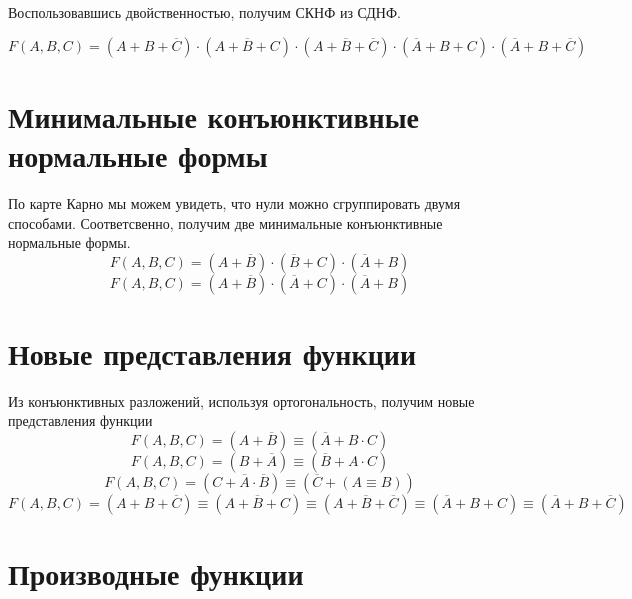 \documentclass[a4paper,10pt]{article} %
\begin{document}
	Воспользовавшись двойственностью, получим СКНФ из СДНФ.
	
	\begin{equation}
		F(A, B, C) = (A + B + \overline{C}) \cdot 
		(A + \overline{B} + C) \cdot (A + \overline{B} + \overline{C}) \cdot
		(\overline{A} + B + C) \cdot (\overline{A} + B + \overline{C})
	\end{equation}
	
	\section{Минимальные конъюнктивные нормальные формы}
	По карте Карно мы можем увидеть, что нули можно сгруппировать двумя способами.
	Соответсвенно, получим две минимальные конъюнктивные нормальные формы.
	\begin{equation}
		F(A, B, C) = (A + \overline{B})
		 \cdot (\overline{B} + C) 
		 \cdot (\overline{A} + B)
	\end{equation}
	\begin{equation}
		F(A, B, C) = (A + \overline{B})
		\cdot (\overline{A} + C) 
		\cdot (\overline{A} + B)
	\end{equation}
	
	\section{Новые представления функции}
	Из конъюнктивных разложений, используя ортогональность, получим новые представления функции
	\begin{equation}
		F(A, B, C) = (A + \overline{B}) \equiv (\overline{A} + B \cdot C)
	\end{equation}
	\begin{equation}
		F(A, B, C) = (B + \overline{A}) \equiv (\overline{B} + A \cdot C)
	\end{equation}
	\begin{equation}
		F(A, B, C) = (C + \overline{A} \cdot \overline{B}) \equiv
		(\overline{C} + (A \equiv B)) 
	\end{equation}
	\begin{equation}
		F(A, B, C) = (A + B + \overline{C}) \equiv
		(A + \overline{B} + C) \equiv (A + \overline{B} + \overline{C}) \equiv
		(\overline{A} + B + C) \equiv (\overline{A} + B + \overline{C})
	\end{equation}
	
	\section{Производные функции}
	
\end{document}
